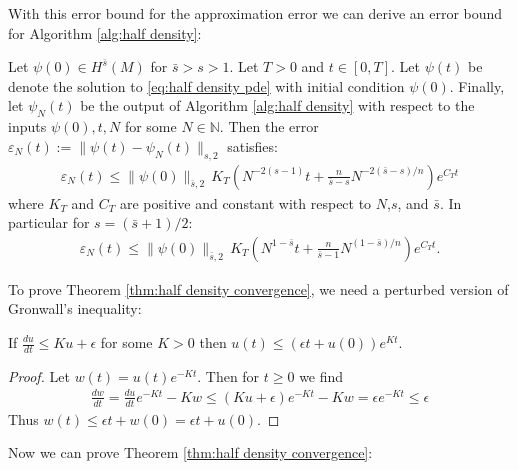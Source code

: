 \documentclass[final,leqno]{siamart}
\begin{document}

With this error bound for the approximation error we can derive an error bound for Algorithm \ref{alg:half density}:

\begin{theorem} \label{thm:half density convergence}
	Let $\psi(0) \in H^{\bar{s}}(M)$ for $\bar{s} > s > 1$.
	Let $T > 0$ and $t \in [0,T]$.
	Let $\psi(t)$ be denote the solution to \eqref{eq:half density pde}
	with initial condition $\psi(0)$.
	Finally, let $\psi_{N}(t)$ be the output of Algorithm \ref{alg:half density}
	with respect to the inputs $\psi(0), t , N$ for some $N \in \mathbb{N}$.
	Then the error $\varepsilon_{N}(t) := \| \psi(t) - \psi_{N}(t) \|_{s,2}$ satisfies:
	\begin{align*}
		\varepsilon_{N}(t) \leq \| \psi(0) \|_{\bar{s},2} \, K_{T} \left( N^{-2(s-1)} t+  \frac{n}{\bar{s}-s} N^{-2(\bar{s}-s)/n} \right) e^{C_{T} t}
	\end{align*}
	where $K_{T}$ and $C_{T}$ are positive and constant with respect to $N$,$s$, and $\bar{s}$.
	In particular for $s = (\bar{s}+1)/2$:
	\begin{align*}
			\varepsilon_{N}(t) \leq \| \psi(0) \|_{\bar{s},2} \, K_{T} \left( N^{1-\bar{s}} t+  \frac{n}{\bar{s}-1} N^{(1-\bar{s})/n} \right) e^{C_{T} t}.
	\end{align*}
\end{theorem}

\noindent To prove Theorem \ref{thm:half density convergence}, we need a perturbed version of Gronwall's inequality:
\begin{lemma} \label{lem:Gronwall}
If $\frac{du}{dt} \leq Ku + \epsilon$ for some $K>0$ then $u(t) \leq (\epsilon t + u(0) ) e^{Kt}$.
\end{lemma}
\begin{proof}
	Let $w (t)= u (t) e^{-Kt}$.  Then for $t \geq 0$ we find
	\begin{align*}
		\frac{dw}{dt} = \frac{du}{dt} e^{-Kt} - K w \leq (Ku+\epsilon) e^{-Kt} - Kw = \epsilon e^{-Kt} \leq \epsilon
	\end{align*}
	Thus $w(t) \leq \epsilon t + w(0) = \epsilon t + u(0)$.
\end{proof}

Now we can prove Theorem \ref{thm:half density convergence}:
\end{document}
